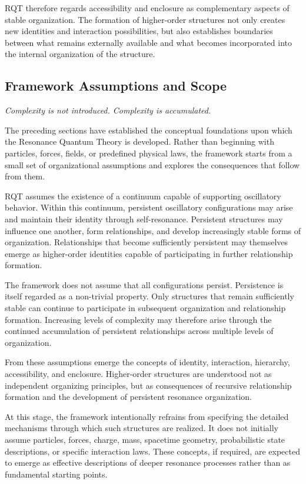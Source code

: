 \documentclass[11pt,a4paper]{article}
\begin{document}
RQT therefore regards accessibility and enclosure as complementary aspects of stable organization. The formation of higher-order structures not only creates new identities and interaction possibilities, but also establishes boundaries between what remains externally available and what becomes incorporated into the internal organization of the structure.



\subsection{Framework Assumptions and Scope}

\emph{Complexity is not introduced. Complexity is accumulated.}

The preceding sections have established the conceptual foundations upon which the Resonance Quantum Theory is developed. Rather than beginning with particles, forces, fields, or predefined physical laws, the framework starts from a small set of organizational assumptions and explores the consequences that follow from them.

RQT assumes the existence of a continuum capable of supporting oscillatory behavior. Within this continuum, persistent oscillatory configurations may arise and maintain their identity through self-resonance. Persistent structures may influence one another, form relationships, and develop increasingly stable forms of organization. Relationships that become sufficiently persistent may themselves emerge as higher-order identities capable of participating in further relationship formation.

The framework does not assume that all configurations persist. Persistence is itself regarded as a non-trivial property. Only structures that remain sufficiently stable can continue to participate in subsequent organization and relationship formation. Increasing levels of complexity may therefore arise through the continued accumulation of persistent relationships across multiple levels of organization.

From these assumptions emerge the concepts of identity, interaction, hierarchy, accessibility, and enclosure. Higher-order structures are understood not as independent organizing principles, but as consequences of recursive relationship formation and the development of persistent resonance organization.

At this stage, the framework intentionally refrains from specifying the detailed mechanisms through which such structures are realized. It does not initially assume particles, forces, charge, mass, spacetime geometry, probabilistic state descriptions, or specific interaction laws. These concepts, if required, are expected to emerge as effective descriptions of deeper resonance processes rather than as fundamental starting points.
\end{document}
